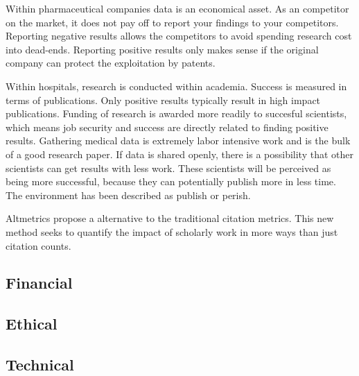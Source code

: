 Within pharmaceutical companies data is an economical asset. As an
competitor on the market, it does not pay off to report your findings
to your competitors. Reporting negative results allows the competitors
to avoid spending research cost into dead-ends. Reporting positive
results only makes sense if the original company can protect the
exploitation by patents.

Within hospitals, research is conducted within
academia. Success is measured in terms of
publications. Only positive results typically result in high impact
publications. Funding of research is awarded more readily to succesful
scientists, which means job security and success are directly related
to finding positive results. Gathering medical data is extremely labor
intensive work and is the bulk of a good research paper. If data is
shared openly, there is a possibility that other scientists can get
results with less work. These scientists will be perceived as being
more successful, because they can potentially publish more in less
time. The environment has been described as publish or
perish.

Altmetrics propose a alternative to the
traditional citation metrics. This new method seeks to quantify the
impact of scholarly work in more ways than just citation counts.

\subsection{Financial}

\subsection{Ethical}

\subsection{Technical}
